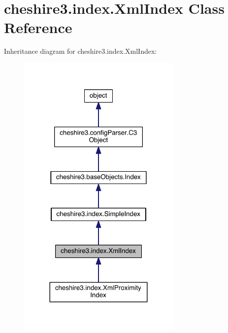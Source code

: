 \hypertarget{classcheshire3_1_1index_1_1_xml_index}{\section{cheshire3.\-index.\-Xml\-Index Class Reference}
\label{classcheshire3_1_1index_1_1_xml_index}
}


Inheritance diagram for cheshire3.\-index.\-Xml\-Index\-:
\nopagebreak
\begin{figure}[H]
\begin{center}
\leavevmode
\includegraphics[width=228pt]{classcheshire3_1_1index_1_1_xml_index__inherit__graph}
\end{center}
\end{figure}


